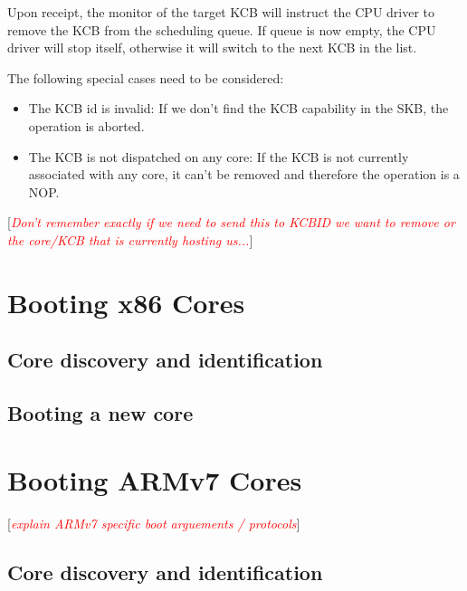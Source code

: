 \documentclass[a4paper,11pt,twoside]{report}
\newcommand{\todo}[1]{[\textcolor{red}{\emph{#1}}]}
\begin{document}
{{\begin{penumerate}
\item Upon receipt, the monitor of the target KCB will instruct the CPU driver
to remove the KCB from the scheduling queue. If queue is now empty, the CPU
driver will stop itself, otherwise it will switch to the next KCB  in the list.

\end{penumerate}

The following special cases need to be considered:

\begin{itemize}

    \item The KCB id is invalid: If we don't find the KCB capability in the SKB,
    the operation is aborted.

    \item The KCB is not dispatched on any core: If the KCB is not currently
    associated with any core, it can't be removed and therefore the operation
    is a NOP.

\end{itemize}

\todo{Don't remember exactly if we need to send this to KCBID we want to
remove or the core/KCB that is currently hosting us...}

\chapter{Booting x86 Cores}
\label{chap:x86}

\section{Core discovery and identification}

\section{Booting a new core}



\chapter{Booting ARMv7 Cores}
\label{chap:armv7}
\todo{explain ARMv7 specific boot arguements / protocols}

\section{Core discovery and identification}

}}
\end{document}
